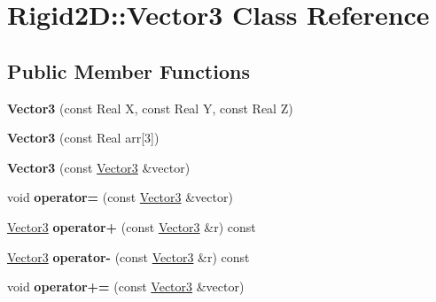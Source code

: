 \hypertarget{class_rigid2_d_1_1_vector3}{
\section{Rigid2D::Vector3 Class Reference}
\label{class_rigid2_d_1_1_vector3}
}
\subsection*{Public Member Functions}
\begin{DoxyCompactItemize}
\item 
\hypertarget{class_rigid2_d_1_1_vector3_a9102703ae2185671dde170ecc663316e}{
{\bfseries Vector3} (const Real X, const Real Y, const Real Z)}
\label{class_rigid2_d_1_1_vector3_a9102703ae2185671dde170ecc663316e}

\item 
\hypertarget{class_rigid2_d_1_1_vector3_a02a9df5dddfb6fee68b0a385959236b0}{
{\bfseries Vector3} (const Real arr\mbox{[}3\mbox{]})}
\label{class_rigid2_d_1_1_vector3_a02a9df5dddfb6fee68b0a385959236b0}

\item 
\hypertarget{class_rigid2_d_1_1_vector3_a459b7d89de4238e6e7b297f71a896bc1}{
{\bfseries Vector3} (const \hyperlink{class_rigid2_d_1_1_vector3}{Vector3} \&vector)}
\label{class_rigid2_d_1_1_vector3_a459b7d89de4238e6e7b297f71a896bc1}

\item 
\hypertarget{class_rigid2_d_1_1_vector3_a872c479f8f22d3d055f67eb7f2df2293}{
void {\bfseries operator=} (const \hyperlink{class_rigid2_d_1_1_vector3}{Vector3} \&vector)}
\label{class_rigid2_d_1_1_vector3_a872c479f8f22d3d055f67eb7f2df2293}

\item 
\hypertarget{class_rigid2_d_1_1_vector3_a100d5d6a847823383e3e624ed1a1f8a7}{
\hyperlink{class_rigid2_d_1_1_vector3}{Vector3} {\bfseries operator+} (const \hyperlink{class_rigid2_d_1_1_vector3}{Vector3} \&r) const }
\label{class_rigid2_d_1_1_vector3_a100d5d6a847823383e3e624ed1a1f8a7}

\item 
\hypertarget{class_rigid2_d_1_1_vector3_ac383c2864d30c9ceb1bbc39e5a191148}{
\hyperlink{class_rigid2_d_1_1_vector3}{Vector3} {\bfseries operator-\/} (const \hyperlink{class_rigid2_d_1_1_vector3}{Vector3} \&r) const }
\label{class_rigid2_d_1_1_vector3_ac383c2864d30c9ceb1bbc39e5a191148}

\item 
\hypertarget{class_rigid2_d_1_1_vector3_aa8fd1edbccea501d0de19a33aa94c27d}{
void {\bfseries operator+=} (const \hyperlink{class_rigid2_d_1_1_vector3}{Vector3} \&vector)}
\label{class_rigid2_d_1_1_vector3_aa8fd1edbccea501d0de19a33aa94c27d}


\end{DoxyCompactItemize}
